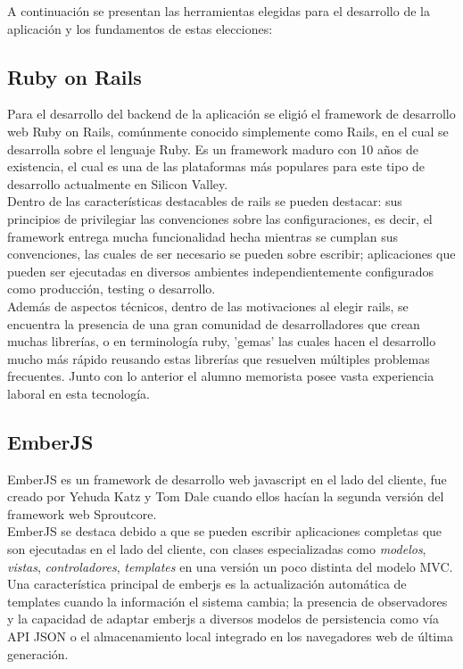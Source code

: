 A continuación se presentan las herramientas elegidas para el desarrollo de la aplicación y los fundamentos de estas elecciones:

\subsection{Ruby on Rails} %
\label{sub:ruby_on_rails}
Para el desarrollo del backend de la aplicación se eligió el framework de desarrollo web Ruby on Rails\cite{rails}, comúnmente conocido simplemente como Rails, en el cual se desarrolla sobre el lenguaje Ruby. Es un framework maduro con 10 años de existencia, el cual es una de las plataformas más populares para este tipo de desarrollo actualmente en Silicon Valley.\\

Dentro de las características destacables de rails se pueden destacar: sus principios de privilegiar las convenciones sobre las configuraciones, es decir, el framework entrega mucha funcionalidad hecha mientras se cumplan sus convenciones, las cuales de ser necesario se pueden sobre escribir; aplicaciones que pueden ser ejecutadas en diversos ambientes independientemente configurados como producción, testing o desarrollo.\\

Además de aspectos técnicos, dentro de las motivaciones al elegir rails, se encuentra la presencia de una gran comunidad de desarrolladores que crean muchas librerías, o en terminología ruby, 'gemas' las cuales hacen el desarrollo mucho más rápido reusando estas librerías que resuelven múltiples problemas frecuentes. Junto con lo anterior el alumno memorista posee vasta experiencia laboral en esta tecnología.

\subsection{EmberJS} %
\label{sub:emberjs}

EmberJS es un framework de desarrollo web javascript en el lado del cliente, fue creado por Yehuda Katz y Tom Dale cuando ellos hacían la segunda versión del framework web Sproutcore.\\

EmberJS se destaca debido a que se pueden escribir aplicaciones completas que son ejecutadas en el lado del cliente, con clases especializadas como \emph{modelos}, \emph{vistas}, \emph{controladores}, \emph{templates} en una versión un poco distinta del modelo MVC. Una característica principal de emberjs es la actualización automática de templates cuando la información el sistema cambia; la presencia de observadores y la capacidad de adaptar emberjs a diversos modelos de persistencia como vía API JSON o el almacenamiento local integrado en los navegadores web de última generación.\\

